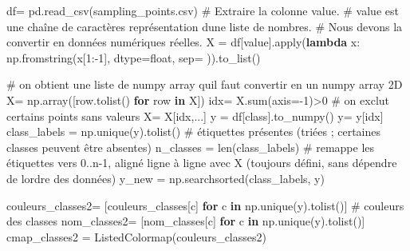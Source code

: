 \documentclass[
  french,
  11pt,
  letterpaper,
  open=any,
  twoside=false,
  french]{scrbook}
\newenvironment{Shaded}{\begin{snugshade}}{\end{snugshade}}
\newcommand{\BuiltInTok}[1]{\textcolor[rgb]{0.00,0.23,0.31}{#1}}
\newcommand{\CommentTok}[1]{\textcolor[rgb]{0.37,0.37,0.37}{#1}}
\newcommand{\ControlFlowTok}[1]{\textcolor[rgb]{0.00,0.23,0.31}{\textbf{#1}}}
\newcommand{\DecValTok}[1]{\textcolor[rgb]{0.68,0.00,0.00}{#1}}
\newcommand{\KeywordTok}[1]{\textcolor[rgb]{0.00,0.23,0.31}{\textbf{#1}}}
\newcommand{\NormalTok}[1]{\textcolor[rgb]{0.00,0.23,0.31}{#1}}
\newcommand{\OperatorTok}[1]{\textcolor[rgb]{0.37,0.37,0.37}{#1}}
\newcommand{\StringTok}[1]{\textcolor[rgb]{0.13,0.47,0.30}{#1}}
\begin{document}
\begin{Shaded}
\begin{Highlighting}[]
\NormalTok{df}\OperatorTok{=}\NormalTok{ pd.read\_csv(}\StringTok{\textquotesingle{}sampling\_points.csv\textquotesingle{}}\NormalTok{)}
\CommentTok{\# Extraire la colonne \textquotesingle{}value\textquotesingle{}.}
\CommentTok{\# \textquotesingle{}value\textquotesingle{} est une chaîne de caractères représentation d\textquotesingle{}une liste de nombres.}
\CommentTok{\# Nous devons la convertir en données numériques réelles.}
\NormalTok{X }\OperatorTok{=}\NormalTok{ df[}\StringTok{\textquotesingle{}value\textquotesingle{}}\NormalTok{].}\BuiltInTok{apply}\NormalTok{(}\KeywordTok{lambda}\NormalTok{ x: np.fromstring(x[}\DecValTok{1}\NormalTok{:}\OperatorTok{{-}}\DecValTok{1}\NormalTok{], dtype}\OperatorTok{=}\BuiltInTok{float}\NormalTok{, sep}\OperatorTok{=}\StringTok{\textquotesingle{} \textquotesingle{}}\NormalTok{)).to\_list()}

\CommentTok{\# on obtient une liste de numpy array  qu\textquotesingle{}il faut convertir en un numpy array 2D}
\NormalTok{X}\OperatorTok{=}\NormalTok{ np.array([row.tolist() }\ControlFlowTok{for}\NormalTok{ row }\KeywordTok{in}\NormalTok{ X])}
\NormalTok{idx}\OperatorTok{=}\NormalTok{ X.}\BuiltInTok{sum}\NormalTok{(axis}\OperatorTok{={-}}\DecValTok{1}\NormalTok{)}\OperatorTok{\textgreater{}}\DecValTok{0} \CommentTok{\# on exclut certains points sans valeurs}
\NormalTok{X}\OperatorTok{=}\NormalTok{ X[idx,...]}
\NormalTok{y }\OperatorTok{=}\NormalTok{ df[}\StringTok{\textquotesingle{}class\textquotesingle{}}\NormalTok{].to\_numpy()}
\NormalTok{y}\OperatorTok{=}\NormalTok{ y[idx]}
\NormalTok{class\_labels }\OperatorTok{=}\NormalTok{ np.unique(y).tolist() }\CommentTok{\# étiquettes présentes (triées ; certaines classes peuvent être absentes)}
\NormalTok{n\_classes }\OperatorTok{=} \BuiltInTok{len}\NormalTok{(class\_labels)}
\CommentTok{\# remappe les étiquettes vers 0..n{-}1, aligné ligne à ligne avec X (toujours défini, sans dépendre de l\textquotesingle{}ordre des données)}
\NormalTok{y\_new }\OperatorTok{=}\NormalTok{ np.searchsorted(class\_labels, y)}

\NormalTok{couleurs\_classes2}\OperatorTok{=}\NormalTok{ [couleurs\_classes[c] }\ControlFlowTok{for}\NormalTok{ c }\KeywordTok{in}\NormalTok{ np.unique(y).tolist()] }\CommentTok{\# couleurs des classes}
\NormalTok{nom\_classes2}\OperatorTok{=}\NormalTok{ [nom\_classes[c] }\ControlFlowTok{for}\NormalTok{ c }\KeywordTok{in}\NormalTok{ np.unique(y).tolist()]}
\NormalTok{cmap\_classes2 }\OperatorTok{=}\NormalTok{ ListedColormap(couleurs\_classes2)}
\end{Highlighting}
\end{Shaded}
\end{document}
